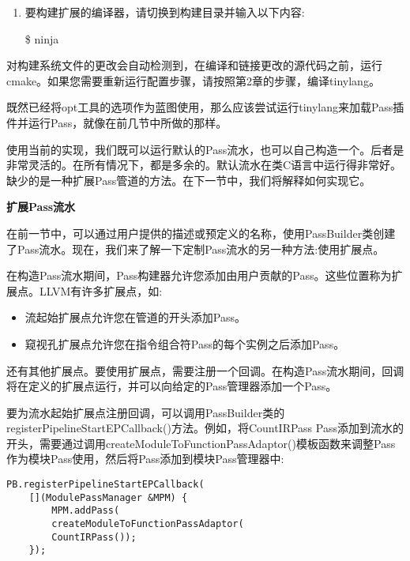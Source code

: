 \begin{enumerate}
\item 要构建扩展的编译器，请切换到构建目录并输入以下内容:
\begin{tcolorbox}[colback=white,colframe=black]
\$ ninja
\end{tcolorbox}
\end{enumerate}

对构建系统文件的更改会自动检测到，在编译和链接更改的源代码之前，运行cmake。如果您需要重新运行配置步骤，请按照第2章的步骤，编译tinylang。\par

既然已经将opt工具的选项作为蓝图使用，那么应该尝试运行tinylang来加载Pass插件并运行Pass，就像在前几节中所做的那样。\par

使用当前的实现，我们既可以运行默认的Pass流水，也可以自己构造一个。后者是非常灵活的。在所有情况下，都是多余的。默认流水在类C语言中运行得非常好。缺少的是一种扩展Pass管道的方法。在下一节中，我们将解释如何实现它。\par



\hspace*{\fill} \par %
\textbf{扩展Pass流水}


在前一节中，可以通过用户提供的描述或预定义的名称，使用PassBuilder类创建了Pass流水。现在，我们来了解一下定制Pass流水的另一种方法:使用扩展点。\par

在构造Pass流水期间，Pass构建器允许您添加由用户贡献的Pass。这些位置称为扩展点。LLVM有许多扩展点，如:\par

\begin{itemize}
\item 流起始扩展点允许您在管道的开头添加Pass。
\item 窥视孔扩展点允许您在指令组合符Pass的每个实例之后添加Pass。
\end{itemize}

还有其他扩展点。要使用扩展点，需要注册一个回调。在构造Pass流水期间，回调将在定义的扩展点运行，并可以向给定的Pass管理器添加一个Pass。\par

要为流水起始扩展点注册回调，可以调用PassBuilder类的registerPipelineStartEPCallback()方法。例如，将CountIRPass Pass添加到流水的开头，需要通过调用createModuleToFunctionPassAdaptor()模板函数来调整Pass作为模块Pass使用，然后将Pass添加到模块Pass管理器中:\par

\begin{lstlisting}[caption={}]
PB.registerPipelineStartEPCallback(
	[](ModulePassManager &MPM) {
		MPM.addPass(
		createModuleToFunctionPassAdaptor(
		CountIRPass());
	});
\end{lstlisting}

